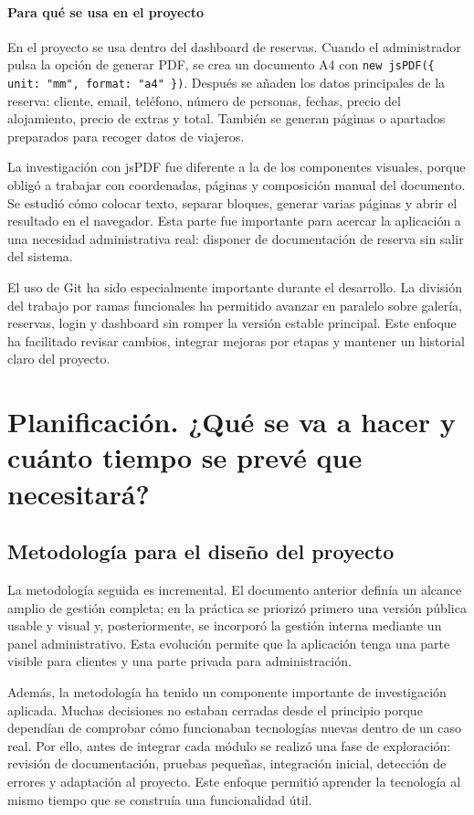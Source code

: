 \documentclass[11pt,a4paper]{article}
\begin{document}
\paragraph{Para qué se usa en el proyecto}
En el proyecto se usa dentro del dashboard de reservas. Cuando el administrador pulsa la opción de generar PDF, se crea un documento A4 con \texttt{new jsPDF(\{ unit: "mm", format: "a4" \})}. Después se añaden los datos principales de la reserva: cliente, email, teléfono, número de personas, fechas, precio del alojamiento, precio de extras y total. También se generan páginas o apartados preparados para recoger datos de viajeros.

La investigación con jsPDF fue diferente a la de los componentes visuales, porque obligó a trabajar con coordenadas, páginas y composición manual del documento. Se estudió cómo colocar texto, separar bloques, generar varias páginas y abrir el resultado en el navegador. Esta parte fue importante para acercar la aplicación a una necesidad administrativa real: disponer de documentación de reserva sin salir del sistema.

El uso de Git ha sido especialmente importante durante el desarrollo. La división del trabajo por ramas funcionales ha permitido avanzar en paralelo sobre galería, reservas, login y dashboard sin romper la versión estable principal. Este enfoque ha facilitado revisar cambios, integrar mejoras por etapas y mantener un historial claro del proyecto.

\section{Planificación. ¿Qué se va a hacer y cuánto tiempo se prevé que necesitará?}

\subsection{Metodología para el diseño del proyecto}
La metodología seguida es incremental. El documento anterior definía un alcance amplio de gestión completa; en la práctica se priorizó primero una versión pública usable y visual y, posteriormente, se incorporó la gestión interna mediante un panel administrativo. Esta evolución permite que la aplicación tenga una parte visible para clientes y una parte privada para administración.

Además, la metodología ha tenido un componente importante de investigación aplicada. Muchas decisiones no estaban cerradas desde el principio porque dependían de comprobar cómo funcionaban tecnologías nuevas dentro de un caso real. Por ello, antes de integrar cada módulo se realizó una fase de exploración: revisión de documentación, pruebas pequeñas, integración inicial, detección de errores y adaptación al proyecto. Este enfoque permitió aprender la tecnología al mismo tiempo que se construía una funcionalidad útil.
\end{document}
